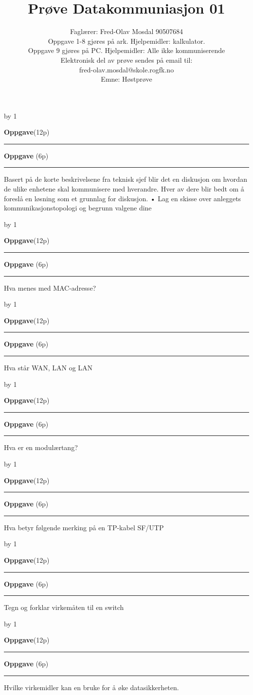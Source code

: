 \documentclass[12pt,a4paper]{article}
\def\oppgave{
            \advance\questnum by 1
	    \ifthenelse{\questnum=1}
	    {
                \vskip 1cm
		\textbf{Oppgave}\hskip 5pt\the\questnum \hfill \hfill(12p)
		\vskip 3pt
		\hrule
	\vskip 0.5cm}
	{
                \vskip 1cm
		\textbf{Oppgave}\hskip 5pt \the\questnum \hfill \hfill(6p)
		\vskip 3pt \hrule \vskip 0.5cm }

		}
\begin{document}
\title{Prøve Datakommuniasjon 01}
\author{Faglærer: Fred-Olav Mosdal 90507684\\
Oppgave 1-8 gjøres på ark. Hjelpemidler: kalkulator. \\
Oppgave 9 gjøres på PC. Hjelpemidler: Alle ikke kommuniserende\\
Elektronisk del av prøve sendes på email til: \\
fred-olav.mosdal@skole.rogfk.no\\
Emne: Høstprøve}
\maketitle
\oppgave{}
Basert på de korte beskrivelsene fra teknisk sjef blir det en diskusjon om hvordan de ulike enhetene skal kommunisere med hverandre. Hver av dere blir bedt om å foreslå en løsning som et grunnlag for diskusjon.
\vskip 5pt 
• Lag en skisse over anleggets kommunikasjonstopologi og begrunn valgene
dine
\vskip 2.5pt 
\newpage

\oppgave{}
Hva menes med MAC-adresse? 
\vskip 2.5pt 
\vskip 2.5pt 
\oppgave{}
Hva står WAN, LAN og LAN  
\vskip 2.5pt 
\vskip 2.5pt 
\oppgave{}
Hva er en modulærtang? 
\vskip 2.5pt 
\vskip 2.5pt 
\oppgave{}
Hva betyr følgende merking på en TP-kabel SF/UTP 
\vskip 2.5pt 
\vskip 2.5pt 
\newpage
\oppgave{}
Tegn og forklar virkemåten til en switch 
\vskip 2.5pt 
\vskip 2.5pt 
\oppgave{}
Hvilke virkemidler kan en bruke for å øke datasikkerheten.  
\vskip 2.5pt 
\end{document}
